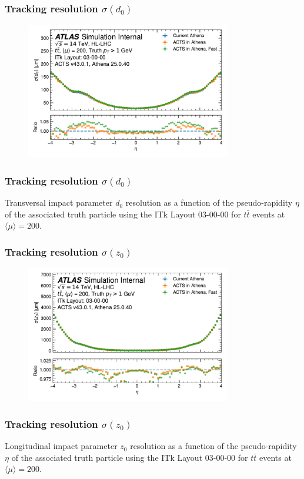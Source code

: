 \documentclass[aspectratio=169]{beamer}
\begin{document}
\begin{frame}
\frametitle{Tracking resolution $\sigma(d_0)$}
\begin{figure}[h]
    \centering
    \includegraphics[width=0.8\textwidth]{plots/tracking_resolution_d0.pdf}
\end{figure}
\end{frame}

\begin{frame}
\frametitle{Tracking resolution $\sigma(d_0)$}
Transversal impact parameter $d_0$ resolution as a function of the pseudo-rapidity $\eta$ of the associated truth particle using the ITk Layout 03-00-00 for $t\bar{t}$ events at $\langle \mu \rangle = 200$.
\end{frame}

\begin{frame}
\frametitle{Tracking resolution $\sigma(z_0)$}
\begin{figure}[h]
    \centering
    \includegraphics[width=0.8\textwidth]{plots/tracking_resolution_z0.pdf}
\end{figure}
\end{frame}

\begin{frame}
\frametitle{Tracking resolution $\sigma(z_0)$}
Longitudinal impact parameter $z_0$ resolution as a function of the pseudo-rapidity $\eta$ of the associated truth particle using the ITk Layout 03-00-00 for $t\bar{t}$ events at $\langle \mu \rangle = 200$.
\end{frame}
\end{document}
